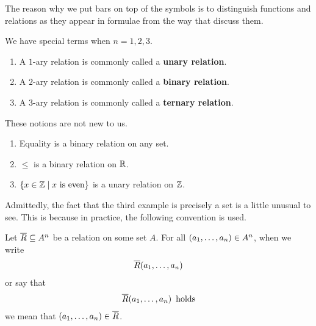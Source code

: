 \begin{boxconvention}
    The reason why we put bars on top of the symbols is to distinguish functions and relations as they appear in formulae from the way that discuss them.
\end{boxconvention}

We have special terms when $n = 1, 2, 3$.

\begin{boxconvention}
    \hfill
    \begin{enumerate}
        \item A $1$-ary relation is commonly called a \textbf{unary relation}.
        \item A $2$-ary relation is commonly called a \textbf{binary relation}.
        \item A $3$-ary relation is commonly called a \textbf{ternary relation}.
    \end{enumerate}
\end{boxconvention}

These notions are not new to us.

\begin{boxexample}
    \hfill
    \begin{enumerate}
        \item Equality is a binary relation on any set.
        \item $\leq$ is a binary relation on $\mathbb{R}$.
        \item $\left\{ x \in \mathbb{Z} \; \middle\vert \; x \text{ is even} \right\}$ is a unary relation on $\mathbb{Z}$.
    \end{enumerate}
\end{boxexample}

Admittedly, the fact that the third example is precisely a set is a little unusual to see. This is because in practice, the following convention is used.

\begin{boxconvention}
    Let $\overline{R} \subseteq A^n$ be a relation on some set $A$. For all $\left( a_1, \ldots, a_n \right) \in A^n$, when we write
    \begin{align*}
        \overline{R}\!\left( a_1, \ldots, a_n \right)
    \end{align*}
    or say that
    \begin{align*}
        \overline{R}\!\left( a_1, \ldots, a_n \right) \text{ holds}
    \end{align*}
    we mean that $\left( a_1, \ldots, a_n \right) \in \overline{R}$.
\end{boxconvention}

